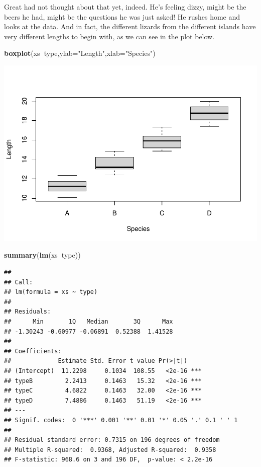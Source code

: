 \documentclass[
]{book}
\newenvironment{Shaded}{\begin{snugshade}}{\end{snugshade}}
\newcommand{\DataTypeTok}[1]{\textcolor[rgb]{0.13,0.29,0.53}{#1}}
\newcommand{\KeywordTok}[1]{\textcolor[rgb]{0.13,0.29,0.53}{\textbf{#1}}}
\newcommand{\NormalTok}[1]{#1}
\newcommand{\OperatorTok}[1]{\textcolor[rgb]{0.81,0.36,0.00}{\textbf{#1}}}
\newcommand{\StringTok}[1]{\textcolor[rgb]{0.31,0.60,0.02}{#1}}
\begin{document}
Great had not thought about that yet, indeed. He's feeling dizzy, might be the beers he had, might be the questions he was just asked! He rushes home and looks at the data. And in fact, the different lizards from the different islands have very different lengths to begin with, as we can see in the plot below.

\begin{Shaded}
\begin{Highlighting}[]
\KeywordTok{boxplot}\NormalTok{(xs}\OperatorTok{~}\NormalTok{type,}\DataTypeTok{ylab=}\StringTok{"Length"}\NormalTok{,}\DataTypeTok{xlab=}\StringTok{"Species"}\NormalTok{)}
\end{Highlighting}
\end{Shaded}

\includegraphics{ECOMODbook_files/figure-latex/a10.6-1.pdf}

\begin{Shaded}
\begin{Highlighting}[]
\KeywordTok{summary}\NormalTok{(}\KeywordTok{lm}\NormalTok{(xs}\OperatorTok{~}\NormalTok{type))}
\end{Highlighting}
\end{Shaded}

\begin{verbatim}
## 
## Call:
## lm(formula = xs ~ type)
## 
## Residuals:
##      Min       1Q   Median       3Q      Max 
## -1.30243 -0.60977 -0.06891  0.52388  1.41528 
## 
## Coefficients:
##             Estimate Std. Error t value Pr(>|t|)    
## (Intercept)  11.2298     0.1034  108.55   <2e-16 ***
## typeB         2.2413     0.1463   15.32   <2e-16 ***
## typeC         4.6822     0.1463   32.00   <2e-16 ***
## typeD         7.4886     0.1463   51.19   <2e-16 ***
## ---
## Signif. codes:  0 '***' 0.001 '**' 0.01 '*' 0.05 '.' 0.1 ' ' 1
## 
## Residual standard error: 0.7315 on 196 degrees of freedom
## Multiple R-squared:  0.9368,	Adjusted R-squared:  0.9358 
## F-statistic: 968.6 on 3 and 196 DF,  p-value: < 2.2e-16
\end{verbatim}
\end{document}
